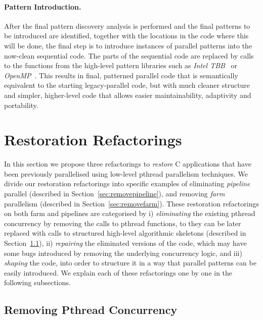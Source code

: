 \paragraph{Pattern Introduction.}
After the final pattern discovery analysis is performed and the final patterns to be introduced are identified, together with the locations in the code where this will be done, the final step is to introduce instances of parallel patterns into the now-clean sequential code. The parts of the sequential code are replaced by calls to the functions from the high-level pattern libraries such as \emph{Intel TBB}~\cite{DBLP:reference/parallel/X11pz} or \emph{OpenMP}~\cite{10.1109/99.660313}. This results in final, patterned parallel code that is semantically equivalent to the starting legacy-parallel code, but with much cleaner structure and simpler, higher-level code that allows easier maintainability, adaptivity and portability.

\section{Restoration Refactorings} \label{sec:refactoring}

In this section we propose three refactorings to \emph{restore} C applications that have been previously parallelised using low-level pthread parallelism techniques. We divide our restoration refactorings into specific examples of eliminating \emph{pipeline} parallel (described in Section~\ref{sec:removepipeline}), and removing \emph{farm} parallelism (described in Section~\ref{sec:removefarm}).
These restoration refactorings on both farm and pipelines are categorised by i) \emph{eliminating} the existing pthread concurrency by removing the calls to pthread functions, to they can be later replaced with calls to structured high-level algorithmic skeletons (described in Section~\ref{sec:removepthread}), ii) \emph{repairing} the eliminated versions of the code, which may have some bugs introduced by removing the underlying concurrency logic, and iii) \emph{shaping} the code, into order to structure it in a way that parallel patterns can be easily introduced. 
We explain each of these refactorings one by one in the following subsections.

\subsection{Removing Pthread Concurrency} \label{sec:removepthread}



